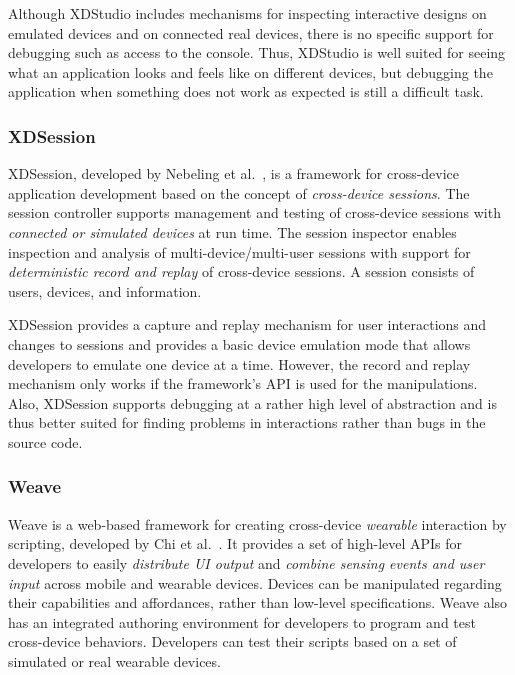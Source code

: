 Although XDStudio includes mechanisms for inspecting interactive designs on emulated devices and on connected real devices, there is no specific support for debugging such as access to the console. Thus, XDStudio is well suited for seeing what an application looks and feels like on different devices, but debugging the application when something does not work as expected is still a difficult task.

\subsubsection{XDSession}

XDSession, developed by Nebeling et al.~\cite{xdsession2015}, is a framework for cross-device application development based on the concept of \emph{cross-device sessions}. The session controller supports management and testing of cross-device sessions with \emph{connected or simulated devices} at run time. The session inspector enables inspection and analysis of multi-device/multi-user sessions with support for \emph{deterministic record and replay} of cross-device sessions. A session consists of users, devices, and information.

XDSession provides a capture and replay mechanism for user interactions and changes to sessions and provides a basic device emulation mode that allows developers to emulate one device at a time. However, the record and replay mechanism only works if the framework's API is used for the manipulations. Also, XDSession supports debugging at a rather high level of abstraction and is thus better suited for finding problems in interactions rather than bugs in the source code.

\subsubsection{Weave}

Weave is a web-based framework for creating cross-device \emph{wearable} interaction by scripting, developed by Chi et al.~\cite{weave2015}. It provides a set of high-level APIs for developers to easily \emph{distribute UI output} and \emph{combine sensing events and user input} across mobile and wearable devices. Devices can be manipulated regarding their capabilities and affordances, rather than low-level specifications. Weave also has an integrated authoring environment for developers to program and test cross-device behaviors. Developers can test their scripts based on a set of simulated or real wearable devices.

